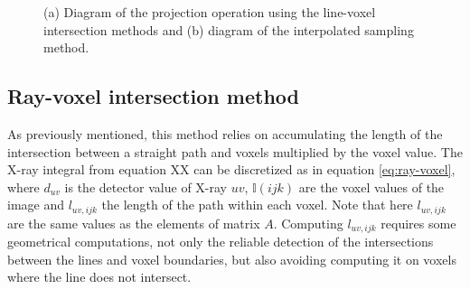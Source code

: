 \begin{figure}

\begin{center} 
 
\caption[Diagram of projection types]{\label{fig:Amatrix}(a) Diagram of the projection operation using the line-voxel intersection methods and (b) diagram of the interpolated sampling method.} 
\end{center} 
\end{figure}

\FloatBarrier

\subsection{Ray-voxel intersection method}

As previously mentioned, this method relies on accumulating the length of the intersection between a straight path and voxels multiplied by the voxel value. The X-ray integral from equation XX can be discretized as in equation \ref{eq:ray-voxel}, where $d_{uv}$ is the detector value of X-ray $uv$, $\mathbb{I}(ijk)$ are the voxel values of the image and $l_{uv,ijk}$ the length of the path within each voxel. Note that here $l_{uv,ijk}$ are the same values as the elements of matrix $A$. Computing $l_{uv,ijk}$ requires some geometrical computations, not only the reliable detection of the intersections between the lines and voxel boundaries, but also avoiding computing it on voxels where the line does not intersect.

